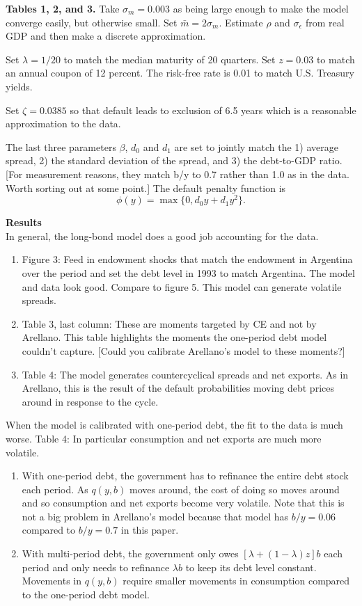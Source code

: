 \documentclass[11pt, pdftex]{article}
\begin{document}
\textbf{Tables 1, 2, and 3.} Take $\sigma_m=0.003$ as being large enough to make the model converge easily, but otherwise small. Set $\bar{m}=2\sigma_m$. Estimate $\rho$ and $\sigma_\epsilon$ from real GDP and then make a discrete approximation.

Set $\lambda=1/20$ to match the median maturity of 20 quarters. Set $z=0.03$ to match an annual coupon of 12 percent. The risk-free rate is 0.01 to match U.S. Treasury yields.

Set $\zeta=0.0385$ so that default leads to exclusion of 6.5 years which is a reasonable approximation to the data.

The last three parameters $\beta$, $d_0$ and $d_1$ are set to jointly match the 1) average spread, 2) the standard deviation of the spread, and 3) the debt-to-GDP ratio. [For measurement reasons, they match b/y to 0.7 rather than 1.0 as in the data. Worth sorting out at some point.] The default penalty function is
\begin{equation}\label{eq:ce-cost-function}
  \phi(y)=\max\{0,d_0y+d_1y^2\}.
\end{equation}

\textbf{Results}\\
In general, the long-bond model does a good job accounting for the data.
\begin{enumerate}
  \item Figure 3: Feed in endowment shocks that match the endowment in Argentina over the period and set the debt level in 1993 to match Argentina. The model and data look good. Compare to \citet{A08} figure 5. This model can generate volatile spreads.

  \item Table 3, last column: These are moments targeted by CE and not by Arellano. This table highlights the moments the one-period debt model couldn't capture. [Could you calibrate Arellano's model to these moments?]

  \item Table 4: The model generates countercyclical spreads and net exports. As in Arellano, this is the result of the default probabilities moving debt prices around in response to the cycle.
\end{enumerate}

When the model is calibrated with one-period debt, the fit to the data is much worse. Table 4: In particular consumption and net exports are much more volatile.
\begin{enumerate}
  \item With one-period debt, the government has to refinance the entire debt stock each period. As $q(y,b)$ moves around, the cost of doing so moves around and so consumption and net exports become very volatile. Note that this is not a big problem in Arellano's model because that model has $b/y=0.06$ compared to $b/y=0.7$ in this paper.
  \item With multi-period debt, the government only owes $[\lambda+(1-\lambda)z]b$ each period and only needs to refinance $\lambda b$ to keep its debt level constant. Movements in $q(y,b)$ require smaller movements in consumption compared to the one-period debt model.
\end{enumerate}
\end{document}
